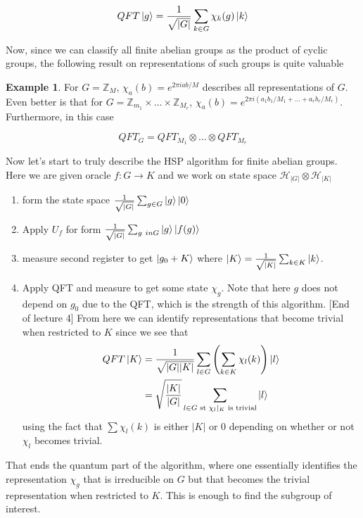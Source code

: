 \documentclass{article}
\theoremstyle{definition}
\newtheorem{example}{Example}
\begin{document}
$$ QFT \ket{g} = \frac{1}{\sqrt{|G|}} \sum_{k \in G} \chi_k(g) \ket{k} $$

Now, since we can classify all finite abelian groups as the product of cyclic
groups, the following result on representations of such groups is quite valuable

\begin{example}
For $G = \mathbb{Z}_M$, $\chi_a(b) = e^{2 \pi i ab / M}$ describes all
representations of $G$. Even better is that for $G = \mathbb{Z}_{m_1} \times
\dots \times \mathbb{Z}_{M_r}$, $\chi_{a}(b) = e^{2\pi i (a_1b_1 / M_1 + \dots +
  a_r b_r / M_r)}$. Furthermore, in this case

$$ QFT_G = QFT_{M_1} \otimes \dots \otimes QFT_{M_r} $$
\end{example}

Now let's start to truly describe the HSP algorithm for finite abelian groups.
Here we are given oracle $f:G \to K$ and we work on state space
$\mathcal{H}_{|G|} \otimes \mathcal{H}_{|K|}$

\begin{enumerate}
\item form the state space $ \frac{1}{\sqrt{|G|}} \sum_{g \in G} \ket{g}\ket{0}$
\item Apply $U_f$ for form $\frac{1}{\sqrt{|G|}} \sum_{g \ in G} \ket{g} \ket{f(g)}$
\item measure second register to get $\ket{g_0 + K}$ where $\ket{K} =
  \frac{1}{\sqrt{|K|}} \sum_{k \in K} \ket{k}$. 
\item Apply QFT and measure to get some state $\chi_g$. Note that here $g$
  does not depend on $g_0$ due to the QFT, which is the strength of this
  algorithm. [End of lecture 4] From here we can identify representations that
  become trivial when restricted to $K$ since we see that
  \begin{align*}
    QFT \ket{K}
    &= \frac{1}{\sqrt{|G||K|}} \sum_{l \in G} \left( \sum_{k \in K} \chi_l(k) \right) \ket{l} \\
    &= \sqrt{\frac{|K|}{|G|}} \sum_{l \in G \text{ st } \chi_l|_K \text{ is trivial}} \ket{l}
  \end{align*}
  using the fact that $\sum \chi_l(k)$ is either $|K|$ or 0 depending on whether
  or not $\chi_l$ becomes trivial.
\end{enumerate}

That ends the quantum part of the algorithm, where one essentially identifies
the representation $\chi_g$ that is irreducible on $G$ but that becomes the
trivial representation when restricted to $K$. This is enough to find the
subgroup of interest.
\end{document}
